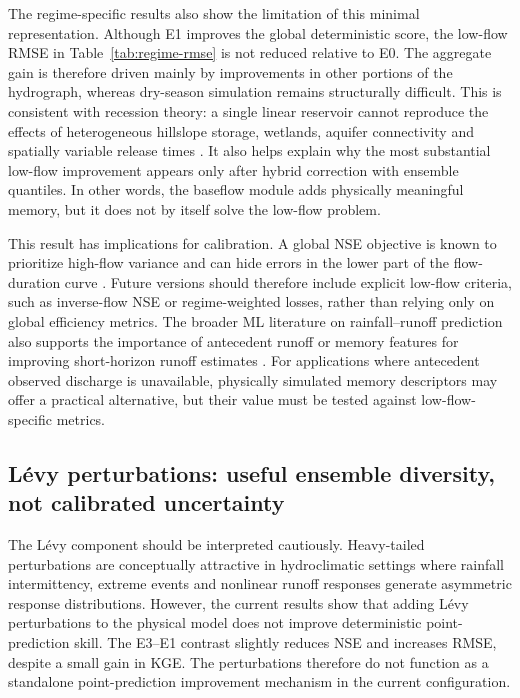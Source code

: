 \documentclass[a4paper,fleqn]{cas-sc}
\begin{document}
The regime-specific results also show the limitation of this minimal
representation. Although E1 improves the global deterministic score, the
low-flow RMSE in Table~\ref{tab:regime-rmse} is not reduced relative to
E0. The aggregate gain is therefore driven mainly by improvements in
other portions of the hydrograph, whereas dry-season simulation remains
structurally difficult. This is consistent with recession theory: a
single linear reservoir cannot reproduce the effects of heterogeneous
hillslope storage, wetlands, aquifer connectivity and spatially variable
release times \citep{harman2009power,van2013influence}. It also helps
explain why the most substantial low-flow improvement appears only after
hybrid correction with ensemble quantiles. In other words, the baseflow
module adds physically meaningful memory, but it does not by itself
solve the low-flow problem.

This result has implications for calibration. A global NSE objective is
known to prioritize high-flow variance and can hide errors in the lower
part of the flow-duration curve \citep{pushpalatha2012review}. Future
versions should therefore include explicit low-flow criteria, such as
inverse-flow NSE or regime-weighted losses, rather than relying only on
global efficiency metrics. The broader ML literature on rainfall--runoff
prediction also supports the importance of antecedent runoff or memory
features for improving short-horizon runoff estimates
\citep{adnan2021comparison,okkan2021embedding}. For applications where
antecedent observed discharge is unavailable, physically simulated
memory descriptors may offer a practical alternative, but their value
must be tested against low-flow-specific metrics.

\subsection{L\'{e}vy perturbations: useful ensemble diversity, not calibrated uncertainty}
\label{subsec:discussion-levy}


The L\'{e}vy component should be interpreted cautiously. Heavy-tailed perturbations are conceptually attractive in hydroclimatic settings where rainfall intermittency, extreme events and nonlinear runoff responses generate asymmetric response distributions. However, the current results show that adding L\'{e}vy perturbations to the physical model does not improve deterministic point-prediction skill. The E3--E1 contrast slightly reduces NSE and increases RMSE, despite a small gain in KGE. The perturbations therefore do not function as a standalone point-prediction improvement mechanism in the current configuration.
\end{document}
